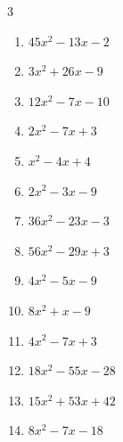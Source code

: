 \begin{multicols}{3}
\begin{enumerate}
        \phantom{$=(2x-3)(3x+1)$}

  \item $45x^{2}-13x-2$

        \phantom{$=(5x-2)(9x+1)$}

  \item $3x^{2}+26x-9$

        \phantom{$=(x+9)(3x-1)$}

  \item $12x^{2}-7x-10$

        \phantom{$=(3x+2)(4x-5)$}

  \item $2x^{2}-7x+3$

        \phantom{$=(x-3)(2x-1)$}

  \item $x^{2}-4x+4$


  \item $2x^{2}-3x-9$

        \phantom{$=(2x+3)(x-3)$}

  \item $36x^{2}-23x-3$

        \phantom{$=(4x-3)(9x+1)$}

  \item $56x^{2}-29x+3$

        \phantom{$=(7x-1)(8x-3)$}

\columnbreak %

  \item $4x^{2}-5x-9$

        \phantom{$=(4x-9)(x+1)$}

  \item $8x^{2}+x-9$

        \phantom{$=(x-1)(8x+9)$}

  \item $4x^{2}-7x+3$

        \phantom{$=(x-1)(4x-3)$}

  \item $18x^{2}-55x-28$

        \phantom{$=(2x-7)(9x+4)$}

  \item $15x^{2}+53x+42$

        \phantom{$=(5x+6)(3x+7)$}

  \item $8x^{2}-7x-18$

        \phantom{$=(8x+9)(x-2)$}


\end{enumerate}
\end{multicols}
